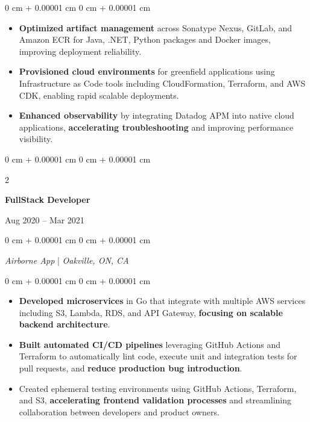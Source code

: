 \documentclass[11pt, letterpaper]{article}
\newenvironment{highlights}{
\begin{itemize}[
topsep=0.10 cm,
parsep=0.10 cm,
partopsep=0pt,
itemsep=0pt,
leftmargin=0 cm + 20pt
]
}{
\end{itemize}
} %
\newenvironment{onecolentry}{
\begin{adjustwidth}{
0 cm + 0.00001 cm
}{
0 cm + 0.00001 cm
}
}{
\end{adjustwidth}
} %
\newenvironment{twocolentry}[2][]{
\onecolentry
\def\secondColumn{#2}
\setcolumnwidth{\fill, 4.5 cm}
\begin{paracol}{2}
}{
\switchcolumn \raggedleft \secondColumn
\end{paracol}
\endonecolentry
} %
\begin{document}
\begin{onecolentry}
\begin{highlights}
\item  \textbf{Optimized artifact management} across Sonatype Nexus, GitLab, and Amazon ECR for Java, .NET, Python packages and Docker images, improving deployment reliability.  \vspace{0.05 cm}

\item \textbf{Provisioned cloud environments} for greenfield applications using Infrastructure as Code tools including CloudFormation, Terraform, and AWS CDK, enabling rapid scalable deployments.
\vspace{0.05 cm}

\item \textbf{Enhanced observability} by integrating Datadog APM into native cloud applications, \textbf{ accelerating troubleshooting} and improving performance visibility. 
\vspace{0.05 cm}
\end{highlights}
\end{onecolentry}

\vspace{0.2 cm}

\begin{twocolentry}{
Aug 2020 – Mar 2021
}
\textbf{FullStack Developer}
\end{twocolentry}

\begin{onecolentry}
\textit{Airborne App} | \textit{Oakville, ON, CA}
\end{onecolentry}

\vspace{0.10 cm}
\begin{onecolentry}
\begin{highlights}


\item  \textbf{Developed microservices} in Go that integrate with multiple AWS services including S3, Lambda, RDS, and API Gateway, \textbf{focusing on scalable backend architecture}. 
\vspace{0.05 cm}

\item \textbf{Built automated CI/CD pipelines} leveraging GitHub Actions and Terraform to automatically lint code, execute unit and integration tests for pull requests, and \textbf{reduce production bug introduction}. 

\item  Created ephemeral testing environments using GitHub Actions, Terraform, and S3, \textbf{accelerating frontend validation processes} and streamlining collaboration between developers and product owners. 
\end{highlights}
\end{onecolentry}
\end{document}

